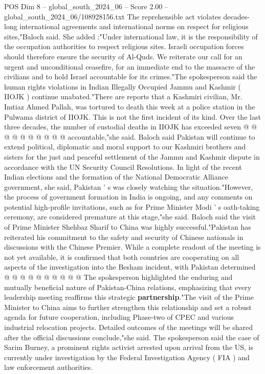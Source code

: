 \begin{textsample}{POS Dim 8 – global\_south\_2024\_06 – Score 2.00 – global\_south\_2024\_06/108928156.txt}
The reprehensible act violates decades-long international agreements and international norms on respect for religious sites,"Baloch said.
She added :"Under international law, it is the responsibility of the occupation authorities to respect religious sites.
Israeli occupation forces should therefore ensure the security of Al-Quds.
We reiterate our call for an urgent and unconditional ceasefire, for an immediate end to the massacre of the civilians and to hold Israel accountable for its crimes."The spokesperson said the human rights violations in Indian Illegally Occupied Jammu and Kashmir ( IIOJK ) continue unabated."There are reports that a Kashmiri civilian, Mr.
Imtiaz Ahmed Pallah, was tortured to death this week at a police station in the Pulwama district of IIOJK.
This is not the first incident of its kind.
Over the last three decades, the number of custodial deaths in IIOJK has exceeded seven @ @ @ @ @ @ @ @ @ @ accountable,"she said.
Baloch said Pakistan will continue to extend political, diplomatic and moral support to our Kashmiri brothers and sisters for the just and peaceful settlement of the Jammu and Kashmir dispute in accordance with the UN Security Council Resolutions.
In light of the recent Indian elections and the formation of the National Democratic Alliance government, she said, Pakistan ' s was closely watching the situation."However, the process of government formation in India is ongoing, and any comments on potential high-profile invitations, such as for Prime Minister Modi ' s oath-taking ceremony, are considered premature at this stage,"she said.
Baloch said the visit of Prime Minister Shehbaz Sharif to China was highly successful."Pakistan has reiterated his commitment to the safety and security of Chinese nationals in discussions with the Chinese Premier.
While a complete readout of the meeting is not yet available, it is confirmed that both countries are cooperating on all aspects of the investigation into the Besham incident, with Pakistan determined @ @ @ @ @ @ @ @ @ @ The spokesperson highlighted the enduring and mutually beneficial nature of Pakistan-China relations, emphasizing that every leadership meeting reaffirms this strategic \textbf{partnership}."The visit of the Prime Minister to China aims to further strengthen this relationship and set a robust agenda for future cooperation, including Phase-two of CPEC and various industrial relocation projects.
Detailed outcomes of the meetings will be shared after the official discussions conclude,"she said.
The spokesperson said the case of Sarim Burney, a prominent rights activist arrested upon arrival from the US, is currently under investigation by the Federal Investigation Agency ( FIA ) and law enforcement authorities.

\end{textsample}
